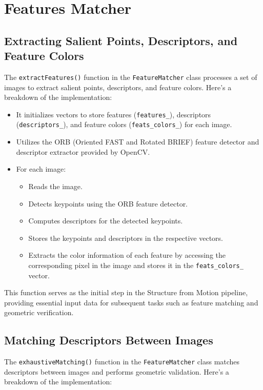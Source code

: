 \documentclass{article}
\begin{document}
\section{Features Matcher}
\subsection{Extracting Salient Points, Descriptors, and Feature Colors}
The \texttt{extractFeatures()} function in the \texttt{FeatureMatcher} class processes a set of images to extract salient points, descriptors, and feature colors. Here's a breakdown of the implementation:

\begin{itemize}
  \item It initializes vectors to store features (\texttt{features\_}), descriptors (\texttt{descriptors\_}), and feature colors (\texttt{feats\_colors\_}) for each image.
  \item Utilizes the ORB (Oriented FAST and Rotated BRIEF) feature detector and descriptor extractor provided by OpenCV.
  \item For each image:
    \begin{itemize}
      \item Reads the image.
      \item Detects keypoints using the ORB feature detector.
      \item Computes descriptors for the detected keypoints.
      \item Stores the keypoints and descriptors in the respective vectors.
      \item Extracts the color information of each feature by accessing the corresponding pixel in the image and stores it in the \texttt{feats\_colors\_} vector.
    \end{itemize}
\end{itemize}

This function serves as the initial step in the Structure from Motion pipeline, providing essential input data for subsequent tasks such as feature matching and geometric verification.


\subsection{Matching Descriptors Between Images}

The \texttt{exhaustiveMatching()} function in the \texttt{FeatureMatcher} class matches descriptors between images and performs geometric validation. Here's a breakdown of the implementation:
\end{document}
